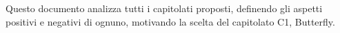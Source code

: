 Questo documento analizza tutti i capitolati proposti, definendo gli aspetti positivi e negativi
di ognuno, motivando la scelta del capitolato C1, Butterfly.